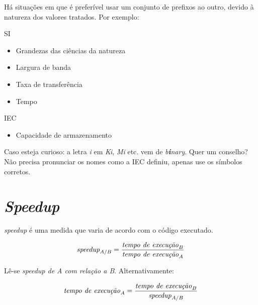 \documentclass[12pt]{article}
\newcommand{\Text}[1]{\textrm{\textit{#1}}}
\begin{document}
Há situações em que é preferível usar um conjunto de prefixos ao outro, devido à natureza dos valores tratados. Por exemplo:

\begin{minipage}[t]{0.5\linewidth}
SI
\begin{itemize}
  \item Grandezas das ciências da natureza
  \item Largura de banda
  \item Taxa de transferência
  \item Tempo
\end{itemize}
\end{minipage}%
\begin{minipage}[t]{0.5\linewidth}
IEC
\begin{itemize}
  \item Capacidade de armazenamento
\end{itemize}
\end{minipage}

\begin{tcolorbox}[title=Dicas,colback=black!3!white,colframe=black!25!white]
  Caso esteja curioso: a letra \emph{i} em \emph{Ki}, \emph{Mi} etc. vem de \emph{b\textbf{i}nary}.
  \tcblower
  Quer um conselho? Não precisa pronunciar os nomes como a IEC definiu, apenas use os símbolos corretos.
\end{tcolorbox}


\section{\textit{Speedup}}


\begin{tcolorbox}[title=Lembre-se]
  \textit{speedup} é uma medida que varia de acordo com o código executado.
\end{tcolorbox}

\begin{equation} \label{eq:speedup}
  \Text{speedup}_{A/B} =
  \frac{\Text{tempo de execução}_B}{\Text{tempo de execução}_A}
\end{equation}

Lê-se \emph{\textit{speedup de A com relação a B}}. Alternativamente:

\[
  \Text{tempo de execução}_A
  = \frac{\Text{tempo de execução}_B}{\Text{speedup}_{A/B}}
\]

\end{document}
